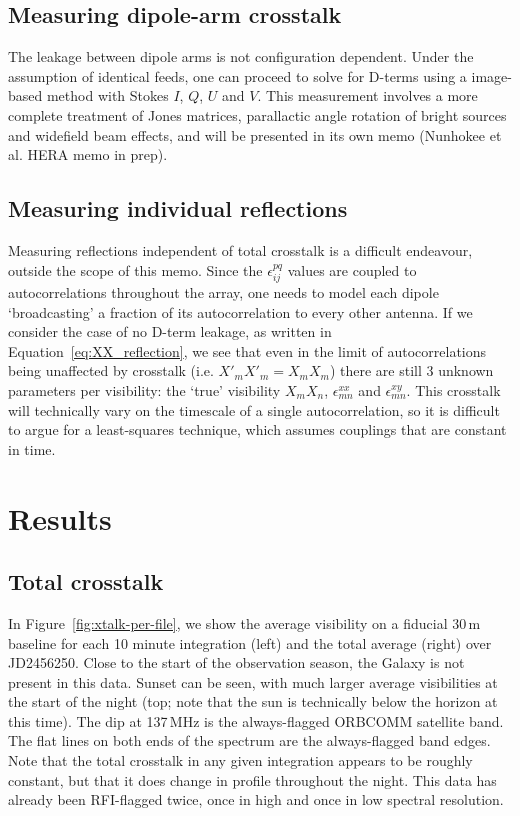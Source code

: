 \documentclass[10pt,a4paper,notitlepage]{article}
\begin{document}
\subsection{Measuring dipole-arm crosstalk}
The leakage between dipole arms is not configuration dependent. Under the assumption of identical feeds, one can proceed to solve for D-terms using a image-based method with Stokes $I$, $Q$, $U$ and $V$. This measurement involves a more complete treatment of Jones matrices, parallactic angle rotation of bright sources  and widefield beam effects, and will be presented in its own memo (Nunhokee et al. HERA memo in prep).

\subsection{Measuring individual reflections}
\label{subsec:method_reflections}

Measuring reflections independent of total crosstalk is a difficult endeavour, outside the scope of this memo. Since the $\epsilon^{pq}_{ij}$ values are coupled to autocorrelations throughout the array, one needs to model each dipole `broadcasting' a fraction of its autocorrelation to every other antenna. If we consider the case of no D-term leakage, as written in Equation~\ref{eq:XX_reflection}, we see that even in the limit of autocorrelations being unaffected by crosstalk (i.e. $X'_mX'_m=X_mX_m$) there are still 3 unknown parameters per visibility: the `true' visibility $X_mX_n$, $\epsilon^{xx}_{mn}$ and $\epsilon^{xy}_{mn}$. 
This crosstalk will technically vary on the timescale of a single autocorrelation, so it is difficult to argue for a least-squares technique, which assumes couplings that are constant in time.

\section{Results}
\label{sec:results}

\subsection{Total crosstalk}
In Figure~\ref{fig:xtalk-per-file}, we show the average visibility on a fiducial 30\,m baseline for each 10 minute integration (left) and the total average (right) over JD2456250. Close to the start of the observation season, the Galaxy is not present in this data. Sunset can be seen, with much larger average visibilities at the start of the night (top; note that the sun is technically below the horizon at this time). The dip at 137\,MHz is the always-flagged ORBCOMM satellite band. The flat lines on both ends of the spectrum are the always-flagged band edges. Note that the total crosstalk in any given integration appears to be roughly constant, but that it does change in profile throughout the night. %
This data has already been RFI-flagged twice, once in high and once in low spectral resolution. \\
\end{document}
